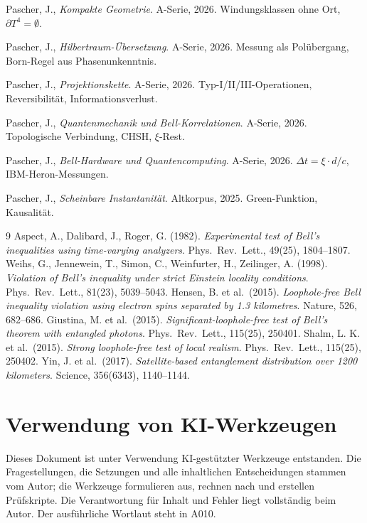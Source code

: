 \begin{description}[leftmargin=3.2em,style=sameline,itemsep=0.3em]
\small
\item[{A030}] Pascher, J., \emph{Kompakte Geometrie}. A-Serie, 2026.
  Windungsklassen ohne Ort, $\partial T^4 = \emptyset$.
\item[{A070}] Pascher, J., \emph{Hilbertraum-Übersetzung}. A-Serie, 2026.
  Messung als Polübergang, Born-Regel aus Phasenunkenntnis.
\item[{A090}] Pascher, J., \emph{Projektionskette}. A-Serie, 2026.
  Typ-I/II/III-Operationen, Reversibilität, Informationsverlust.
\item[{A160}] Pascher, J., \emph{Quantenmechanik und Bell-Korrelationen}.
  A-Serie, 2026. Topologische Verbindung, CHSH, $\xi$-Rest.
\item[{A165}] Pascher, J., \emph{Bell-Hardware und Quantencomputing}.
  A-Serie, 2026. $\Delta t = \xi \cdot d/c$, IBM-Heron-Messungen.
\item[{Dok.~131}] Pascher, J., \emph{Scheinbare Instantanität}.
  Altkorpus, 2025. Green-Funktion, Kausalität.
\end{description}

\begin{thebibliography}{9}
\small
{}
Aspect, A., Dalibard, J., Roger, G. (1982).
\emph{Experimental test of Bell's inequalities using time-varying analyzers}.
Phys.\ Rev.\ Lett., 49(25), 1804--1807.
Weihs, G., Jennewein, T., Simon, C., Weinfurter, H., Zeilinger, A. (1998).
\emph{Violation of Bell's inequality under strict Einstein locality conditions}.
Phys.\ Rev.\ Lett., 81(23), 5039--5043.
Hensen, B. et al.\ (2015).
\emph{Loophole-free Bell inequality violation using electron spins
separated by 1.3 kilometres}. Nature, 526, 682--686.
Giustina, M. et al.\ (2015).
\emph{Significant-loophole-free test of Bell's theorem with entangled photons}.
Phys.\ Rev.\ Lett., 115(25), 250401.
Shalm, L. K. et al.\ (2015).
\emph{Strong loophole-free test of local realism}.
Phys.\ Rev.\ Lett., 115(25), 250402.
Yin, J. et al.\ (2017).
\emph{Satellite-based entanglement distribution over 1200 kilometers}.
Science, 356(6343), 1140--1144.
\end{thebibliography}

\section{Verwendung von KI-Werkzeugen}

Dieses Dokument ist unter Verwendung KI-gestützter Werkzeuge entstanden. Die
Fragestellungen, die Setzungen und alle inhaltlichen Entscheidungen stammen vom
Autor; die Werkzeuge formulieren aus, rechnen nach und erstellen Prüfskripte.
Die Verantwortung für Inhalt und Fehler liegt vollständig beim Autor. Der
ausführliche Wortlaut steht in A010.

